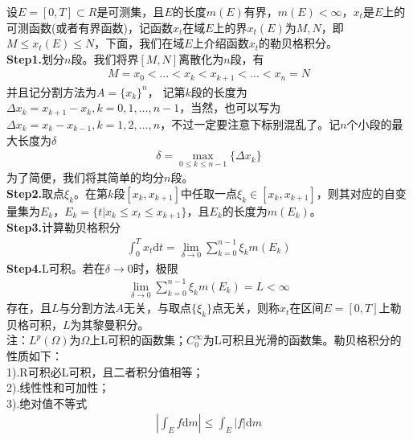             \par
            设$E = [0,T] \subset R$是可测集，且$E$的长度$m(E)$有界，$m(E)<\infty$，$x_t$是$E$上的可测函数(或者有界函数)，记函数$x_t$在域$E$上的界$x_t(E)$为$M,N$，即$M \leqslant x_t(E) \leqslant N$，下面，我们在域$E$上介绍函数$x_t$的勒贝格积分。\\
            \textbf{Step1.}划分$n$段。我们将界$[M,N]$离散化为$n$段，有
            \begin{align*}
                M = x_0 <\dots <x_k < x_{k+1} <\dots<x_n = N
            \end{align*}
            并且记分割方法为$A = \{x_k\}^n$，
            记第$k$段的长度为$\Delta x_k = x_{k+1}-x_k,k = 0,1,\dots,n - 1$，当然，也可以写为$\Delta x_k = x_{k}-x_{k-1},k = 1,2,\dots,n$，不过一定要注意下标别混乱了。记$n$个小段的最大长度为$\delta$
            \begin{align*}
                \delta = \max_{0 \leqslant k \leqslant n-1}\{\Delta x_k\}
            \end{align*}
            为了简便，我们将其简单的均分$n$段。\\
            \textbf{Step2.}取点$\xi_k$。在第$k$段$[x_{k},x_{k+1}]$中任取一点$\xi_k\in [x_{k},x_{k+1}]$，则其对应的自变量集为$E_k$，$E_k = \{t|x_k \leqslant x_t \leqslant x_{k+1}\}$，且$E_k$的长度为$m(E_k)$。\\
            \textbf{Step3.}计算勒贝格积分
            \begin{align*}
                \int_0^T x_t\mathrm{d}t = \lim_{\delta \rightarrow 0} \sum_{k = 0}^{n-1} \xi_k m(E_k)
            \end{align*}
            \textbf{Step4.}L可积。若在$\delta\rightarrow 0$时，极限
            \begin{align*}
                \lim_{\delta \rightarrow 0} \sum_{k = 0}^{n-1} \xi_k m(E_k) = L<\infty
            \end{align*}
            存在，且$L$与分割方法$A$无关，与取点$\{\xi_k\}$点无关，则称$x_t$在区间$E = [0,T]$上勒贝格可积，$L$为其黎曼积分。\\
            注：$L^p(\Omega)$为$\Omega$上L可积的函数集；$C_0^\infty$为L可积且光滑的函数集。勒贝格积分的性质如下：\\
            1).R可积必L可积，且二者积分值相等；\\
            2).线性性和可加性；\\
            3).绝对值不等式
            \begin{align*}
                \left| \int_E f\mathrm{d}m \right| \leqslant \int_E |f| \mathrm{d}m
            \end{align*}
